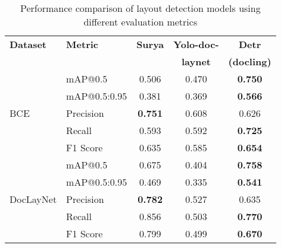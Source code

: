 \begin{table}[b]
\centering
\renewcommand{\arraystretch}{1.1}
\setlength{\tabcolsep}{2.5pt}
\footnotesize
\small
\begin{tabular}{l l | c c c}
\toprule
\textbf{Dataset} & \textbf{Metric} & \textbf{Surya} & \textbf{Yolo-doc-} & \textbf{Detr} \\
& & & \textbf{laynet} & \textbf{(docling)} \\
\midrule
\multirow{5}{*}{BCE} & mAP@0.5 & 0.506 & 0.470 & \textbf{0.750} \\
& mAP@0.5:0.95 & 0.381 & 0.369 & \textbf{0.566} \\
& Precision & \textbf{0.751} & 0.608 & 0.626 \\
& Recall & 0.593 & 0.592 & \textbf{0.725} \\
& F1 Score & 0.635 & 0.585 & \textbf{0.654} \\
\midrule
\multirow{5}{*}{DocLayNet} & mAP@0.5 & 0.675 & 0.404 & \textbf{0.758} \\
& mAP@0.5:0.95 & 0.469 & 0.335 & \textbf{0.541} \\
& Precision & \textbf{0.782} & 0.527 & 0.635 \\
& Recall & 0.856 & 0.503 & \textbf{0.770} \\
& F1 Score & 0.799 & 0.499 & \textbf{0.670} \\
\bottomrule
\end{tabular}
\caption{Performance comparison of layout detection models using different evaluation metrics}
\label{tab:layout-detection}
\end{table}